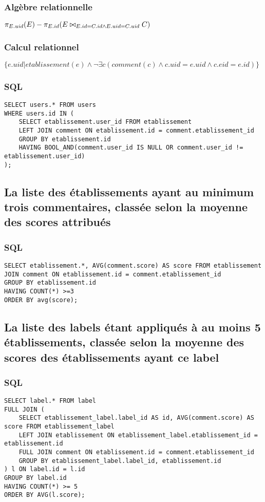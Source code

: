 \subsubsection{Algèbre relationnelle}
\(
\pi_{E.uid}(E) - \pi_{E.id}(E\bowtie_{E.id = C.id \land E.uid = C.uid}C)
\)
\subsubsection{Calcul relationnel}
\(
\{e.uid|etablissement(e)\land \neg \exists c(comment(c) \land c.uid = e.uid \land c.eid = e.id)\}
\)
\subsubsection{SQL}
\begin{lstlisting}
SELECT users.* FROM users 
WHERE users.id IN (
    SELECT etablissement.user_id FROM etablissement 
    LEFT JOIN comment ON etablissement.id = comment.etablissement_id 
    GROUP BY etablissement.id 
    HAVING BOOL_AND(comment.user_id IS NULL OR comment.user_id != etablissement.user_id)
);
\end{lstlisting}

\subsection{La liste des établissements ayant au minimum trois commentaires, classée selon la moyenne des scores attribués}
\subsubsection{SQL}
\begin{lstlisting}
SELECT etablissement.*, AVG(comment.score) AS score FROM etablissement 
JOIN comment ON etablissement.id = comment.etablissement_id 
GROUP BY etablissement.id 
HAVING COUNT(*) >=3 
ORDER BY avg(score);
\end{lstlisting}

\subsection{La liste des labels étant appliqués à au moins 5 établissements, classée selon la moyenne des scores des établissements ayant ce label}
\subsubsection{SQL}
\begin{lstlisting}
SELECT label.* FROM label 
FULL JOIN (
    SELECT etablissement_label.label_id AS id, AVG(comment.score) AS score FROM etablissement_label 
    LEFT JOIN etablissement ON etablissement_label.etablissement_id = etablissement.id 
    FULL JOIN comment ON etablissement.id = comment.etablissement_id 
    GROUP BY etablissement_label.label_id, etablissement.id
) l ON label.id = l.id 
GROUP BY label.id 
HAVING COUNT(*) >= 5 
ORDER BY AVG(l.score);
\end{lstlisting}
